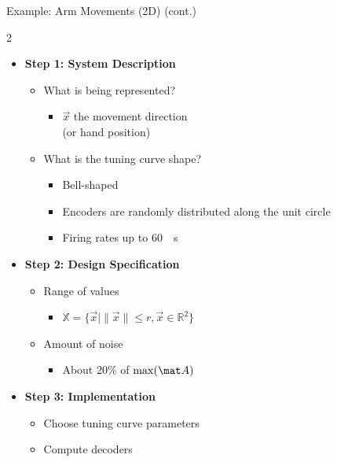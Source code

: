 \documentclass[handout,aspectratio=169]{beamer}
\begin{document}
\begin{frame}{Example: Arm Movements (2D) (cont.)}
	\begin{multicols}{2}
		\begin{itemize}
			\setlength{\itemsep}{0.5cm}
			\item \textbf{Step 1: System Description}
			\begin{itemize}
				\setlength{\itemsep}{0.5cm}
				\item What is being represented?
				\begin{itemize}
					\setlength{\itemsep}{0.25cm}
					\item $\vec x$ the movement direction\\(or hand position)
				\end{itemize}
				\item What is the tuning curve shape?
				\begin{itemize}
					\setlength{\itemsep}{0.25cm}
					\item Bell-shaped
					\item Encoders are randomly distributed along the unit circle
					\item Firing rates up to \SI{60}{\per\second}
				\end{itemize}
			\end{itemize}
			\columnbreak
			\item \textbf{Step 2: Design Specification}
			\begin{itemize}
				\setlength{\itemsep}{0.25cm}
				\item Range of values
				\begin{itemize}
					\item $\mathbb{X} = \{\vec x \mid \|\vec x\| \leq r, \vec x \in \mathbb{R}^2 \}$
				\end{itemize}
				\item Amount of noise
				\begin{itemize}
					\setlength{\itemsep}{0.25cm}
					\item About $20\%$ of $\max(\mat A)$
				\end{itemize}
			\end{itemize}
			\item \textbf{Step 3: Implementation}
			\begin{itemize}
				\setlength{\itemsep}{0.25cm}
				\item Choose tuning curve parameters
				\item Compute decoders
			\end{itemize}
		\end{itemize}
	\end{multicols}
\end{frame}
\end{document}
